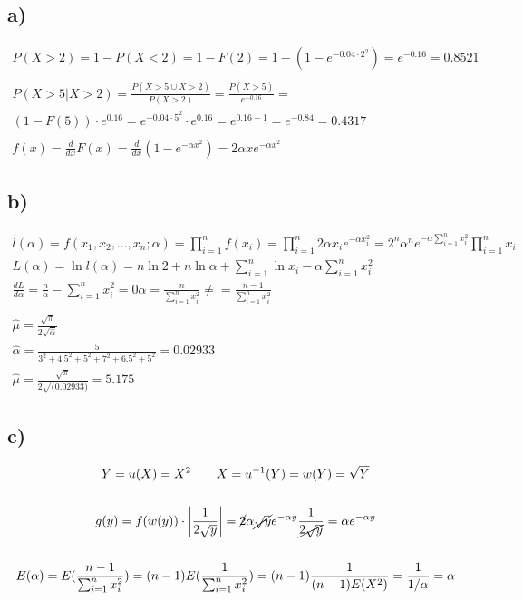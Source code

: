 \subsection*{a)}


\begin{gather*}
	P(X > 2) = 1 - P(X < 2) = 1 - F(2) = 1 - (1 - e^{-0.04 \cdot 2^2})
	=
	e^{-0.16} = 0.8521
	\\
	\\
	P(X > 5 | X > 2) = \frac{P(X > 5 \cup X > 2)}{P(X > 2)} = \frac{P(X > 5)}{e^{-0.16}}
	=
	\\
	(1 - F(5)) \cdot e^{0.16} = e^{-0.04 \cdot 5^2} \cdot e^{0.16} = e^{0.16 - 1} = e^{-0.84} = 0.4317
	\\
	\\
	f(x) = \frac{d}{dx} F(x) = \frac{d}{dx} (1 - e^{-\alpha x^2}) = 2 \alpha x e^{-\alpha x^2}
\end{gather*}


\subsection*{b)}


\begin{gather*}
	l(\alpha) = f(x_1, x_2, ... , x_n; \alpha) = \prod_{i = 1}^n{f(x_i)}
	=
	\prod_{i = 1}^n{2 \alpha x_i e^{-\alpha x_i^2}}
	=
	2^n \alpha^n e^{- \alpha \sum_{i = 1}^n{x_i^2}} \prod_{i = 1}^n{x_i}
	\\
	L(\alpha) = \ln{l(\alpha)} = n \ln{2} + n \ln{\alpha} + \sum_{i = 1}^n{\ln{x_i}} - \alpha \sum_{i = 1}^n{x_i^2}
	\\
	\frac{d L}{d \alpha} = \frac{n}{\alpha} - \sum_{i = 1}^n{x_i^2} = 0
	\alpha = \frac{n}{\sum_{i = 1}^n{x_i^2}} \neq = \frac{n - 1}{\sum_{i = 1}^n{x_i^2}}
	\\
	\\
	\hat \mu = \frac{\sqrt{\pi}}{2 \sqrt{\hat \alpha}}
	\\
	\hat \alpha = \frac{5}{3^2 + 4.5^2 + 5^2 + 7^2 + 6.5^2 + 5^2} = 0.02933
	\\
	\hat \mu = \frac{\sqrt{\pi}}{2 \sqrt(0.02933)} = 5.175
\end{gather*}


\subsection*{c)}


\begin{gather*}
	Y = u(X) = X^2
	\qquad
	X = u^{-1}(Y) = w(Y) = \sqrt{Y}
	\\
	\\
	g(y) = f(w(y)) \cdot \left| \frac{1}{2 \sqrt{y}} \right|
	=
	\cancel{2} \alpha \cancel{\sqrt{y}} e^{-\alpha y} \frac{1}{\cancel{2 \sqrt{y}}}
	=
	\alpha e^{-\alpha y}
	\\
	\\
	E(\alpha) = E(\frac{n - 1}{\sum_{i = 1}^{n}{x_i^2}})
	=
	(n - 1) E(\frac{1}{\sum_{i = 1}^{n}{x_i^2}})
	=
	(n - 1) \frac{1}{(n - 1) E(X^2)} = \frac{1}{1 / \alpha} = \alpha
\end{gather*}


